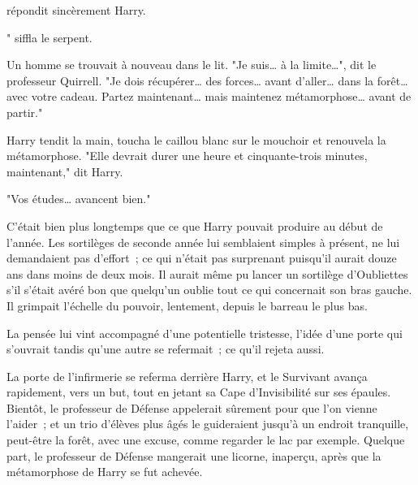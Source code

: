  répondit sincèrement Harry.

" siffla le serpent. 





Un homme se trouvait à nouveau dans le lit. "Je suis… à la limite…", dit le professeur Quirrell. "Je dois récupérer… des forces… avant d'aller… dans la forêt… avec votre cadeau. Partez maintenant… mais maintenez métamorphose… avant de partir."

Harry tendit la main, toucha le caillou blanc sur le mouchoir et renouvela la métamorphose. "Elle devrait durer une heure et cinquante-trois minutes, maintenant," dit Harry.

"Vos études… avancent bien."

C'était bien plus longtemps que ce que Harry pouvait produire au début de l'année. Les sortilèges de seconde année lui semblaient simples à présent, ne lui demandaient pas d'effort~; ce qui n'était pas surprenant puisqu'il aurait douze ans dans moins de deux mois. Il aurait même pu lancer un sortilège d'Oubliettes s'il s'était avéré bon que quelqu'un oublie tout ce qui concernait son bras gauche. Il grimpait l'échelle du pouvoir, lentement, depuis le barreau le plus bas.

La pensée lui vint accompagné d'une potentielle tristesse, l'idée d'une porte qui s'ouvrait tandis qu'une autre se refermait~; ce qu'il rejeta aussi.

\later

La porte de l'infirmerie se referma derrière Harry, et le Survivant avança rapidement, vers un but, tout en jetant sa Cape d'Invisibilité sur ses épaules. Bientôt, le professeur de Défense appelerait sûrement pour que l'on vienne l'aider~; et un trio d'élèves plus âgés le guideraient jusqu'à un endroit tranquille, peut-être la forêt, avec une excuse, comme regarder le lac par exemple. Quelque part, le professeur de Défense mangerait une licorne, inaperçu, après que la métamorphose de Harry se fut achevée.

